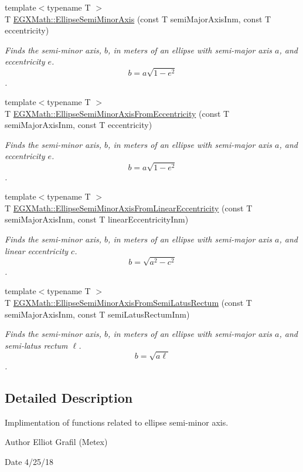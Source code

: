 \begin{DoxyCompactItemize}
\item 
{\footnotesize template$<$typename T $>$ }\\T \mbox{\hyperlink{group___e_g_x_math-_geometry-2_d-_ellipse-_semi_minor_axis_gae461acf3333565d69527dd86e9aa2b32}{E\+G\+X\+Math\+::\+Ellipse\+Semi\+Minor\+Axis}} (const T semi\+Major\+Axis\+Inm, const T eccentricity)
\begin{DoxyCompactList}\small\item\em Finds the semi-\/minor axis, $b$, in meters of an ellipse with semi-\/major axis $a$, and eccentricity $e$. \[ b=a \sqrt{1-e^2} \]. \end{DoxyCompactList}\item 
{\footnotesize template$<$typename T $>$ }\\T \mbox{\hyperlink{group___e_g_x_math-_geometry-2_d-_ellipse-_semi_minor_axis_ga084ff3f954a39e9cb5c30ef0e99e13e4}{E\+G\+X\+Math\+::\+Ellipse\+Semi\+Minor\+Axis\+From\+Eccentricity}} (const T semi\+Major\+Axis\+Inm, const T eccentricity)
\begin{DoxyCompactList}\small\item\em Finds the semi-\/minor axis, $b$, in meters of an ellipse with semi-\/major axis $a$, and eccentricity $e$. \[ b=a \sqrt{1-e^2} \]. \end{DoxyCompactList}\item 
{\footnotesize template$<$typename T $>$ }\\T \mbox{\hyperlink{group___e_g_x_math-_geometry-2_d-_ellipse-_semi_minor_axis_gaa4ea6226a5d163ba24fd81fd86693692}{E\+G\+X\+Math\+::\+Ellipse\+Semi\+Minor\+Axis\+From\+Linear\+Eccentricity}} (const T semi\+Major\+Axis\+Inm, const T linear\+Eccentricity\+Inm)
\begin{DoxyCompactList}\small\item\em Finds the semi-\/minor axis, $b$, in meters of an ellipse with semi-\/major axis $a$, and linear eccentricity $c$. \[ b=\sqrt{a^2-c^2} \]. \end{DoxyCompactList}\item 
{\footnotesize template$<$typename T $>$ }\\T \mbox{\hyperlink{group___e_g_x_math-_geometry-2_d-_ellipse-_semi_minor_axis_ga0319f47f355a8246f57c5bb7287d7a5f}{E\+G\+X\+Math\+::\+Ellipse\+Semi\+Minor\+Axis\+From\+Semi\+Latus\+Rectum}} (const T semi\+Major\+Axis\+Inm, const T semi\+Latus\+Rectum\+Inm)
\begin{DoxyCompactList}\small\item\em Finds the semi-\/minor axis, $b$, in meters of an ellipse with semi-\/major axis $a$, and semi-\/latus rectum $\ell$. \[ b= \sqrt{a\ell} \]. \end{DoxyCompactList}\end{DoxyCompactItemize}


\subsection{Detailed Description}
Implimentation of functions related to ellipse semi-\/minor axis. 

\begin{DoxyAuthor}{Author}
Elliot Grafil (Metex) 
\end{DoxyAuthor}
\begin{DoxyDate}{Date}
4/25/18 
\end{DoxyDate}
